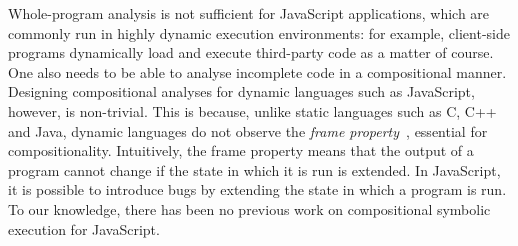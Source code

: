 \documentclass[sigconf, review]{acmart}
\newcommand{\polish}[1]{{\color{red}#1}}
\newcommand{\pgmaxinline}[1]{ {\color{purple} *** PG : #1 ***} }
\begin{document}
Whole-program analysis is not sufficient for JavaScript applications, 
which are commonly run in highly dynamic execution
environments: for example, client-side programs dynamically load and
execute third-party code as a matter of course. One also needs to be
able to analyse incomplete code in a compositional manner.
Designing compositional analyses for dynamic languages such as JavaScript, 
however, is non-trivial. This is because, unlike static languages
such as C, C++ and Java, dynamic languages do not observe the
\emph{frame property}~\cite{reynolds:lics:2002}, essential for
compositionality. Intuitively, the frame property means that the
output of a program cannot change if the state in which it is run is
extended. In JavaScript, it is possible to introduce bugs by 
extending the state in which a program is run. To our knowledge, 
there has been no previous work on compositional symbolic execution
for JavaScript.








\end{document}
